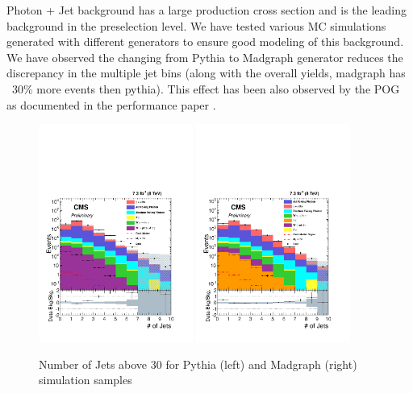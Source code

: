 Photon + Jet background has a large production cross section and is the leading background in the preselection level. We have tested various MC simulations generated with different generators to ensure good modeling of this background. We have observed the changing from Pythia to Madgraph generator reduces the discrepancy in the multiple jet bins (along with the overall yields, madgraph has ~30\% more events then pythia). This effect has been also observed by the \met POG as documented in the \met performance paper \cite{metperformance}. 

\begin{figure}[!h]
 \centering
  {\label{fig:madgraph}\includegraphics[width=0.45\textwidth]{analysis_figs/pythia.pdf}}
  {\label{fig:pythia}\includegraphics[width=0.45\textwidth]{analysis_figs/madgraph.pdf}} 
 \caption{Number of Jets above 30 \GeV for Pythia (left) and Madgraph (right) simulation samples}
 \label{fig:njets}
\end{figure}     

